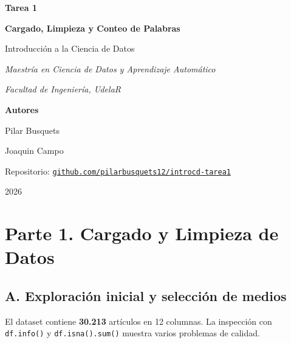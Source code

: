 \documentclass[a4paper,11pt]{article}
\begin{document}
\begin{titlepage}
  \centering
  \vspace*{3cm}

  {\LARGE\bfseries\color{azulOscuro} Tarea 1\par}
  \vspace{0.4cm}
  {\Large\bfseries Cargado, Limpieza y Conteo de Palabras\par}

  \vspace{2.5cm}

  {\large Introducción a la Ciencia de Datos\par}
  \vspace{0.3cm}
  {\itshape\color{gray} Maestría en Ciencia de Datos y Aprendizaje Automático\par}
  {\itshape\color{gray} Facultad de Ingeniería, UdelaR\par}

  \vfill

  {\large\bfseries Autores\par}
  \vspace{0.3cm}
  {\large Pilar Busquets\par}
  {\large Joaquin Campo\par}

  \vspace{1cm}

  {\small Repositorio: \href{https://github.com/pilarbusquets12/introcd-tarea1}{\texttt{github.com/pilarbusquets12/introcd-tarea1}}\par}

  \vfill

  {\large 2026\par}
  \vspace{2cm}
\end{titlepage}

\section{Parte 1. Cargado y Limpieza de Datos}

\subsection{A. Exploración inicial y selección de medios}

El dataset contiene \textbf{30.213} artículos en 12 columnas. La inspección con \texttt{df.info()} y \texttt{df.isna().sum()} muestra varios problemas de calidad.
\end{document}
